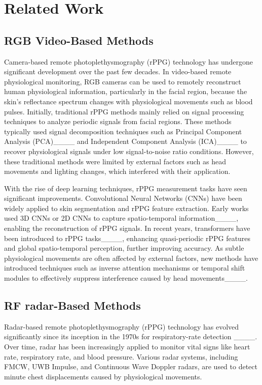 \section{Related Work}
\label{sec:relatedwork}

\subsection{RGB Video-Based Methods}

Camera-based remote photoplethysmography (rPPG) technology has undergone significant development over the past few decades. In video-based remote physiological monitoring, RGB cameras can be used to remotely reconstruct human physiological information, particularly in the facial region, because the skin’s reflectance spectrum changes with physiological movements such as blood pulses. Initially, traditional rPPG methods mainly relied on signal processing techniques to analyze periodic signals from facial regions. These methods typically used signal decomposition techniques such as Principal Component Analysis (PCA)____ and Independent Component Analysis (ICA)____ to recover physiological signals under low signal-to-noise ratio conditions. However, these traditional methods were limited by external factors such as head movements and lighting changes, which interfered with their application.

With the rise of deep learning techniques, rPPG measurement tasks have seen significant improvements. Convolutional Neural Networks (CNNs) have been widely applied to skin segmentation and rPPG feature extraction. Early works used 3D CNNs or 2D CNNs to capture spatio-temporal information____, enabling the reconstruction of rPPG signals. In recent years, transformers have been introduced to rPPG tasks____, enhancing quasi-periodic rPPG features and global spatio-temporal perception, further improving accuracy. As subtle physiological movements are often affected by external factors, new methods have introduced techniques such as inverse attention mechanisms or temporal shift modules to effectively suppress interference caused by head movements____.

\vspace{-0.8em}
\subsection{RF radar-Based Methods}
Radar-based remote photoplethysmography (rPPG) technology has evolved significantly since its inception in the 1970s for respiratory-rate detection ____. Over time, radar has been increasingly applied to monitor vital signs like heart rate, respiratory rate, and blood pressure. Various radar systems, including FMCW, UWB Impulse, and Continuous Wave Doppler radars, are used to detect minute chest displacements caused by physiological movements.


